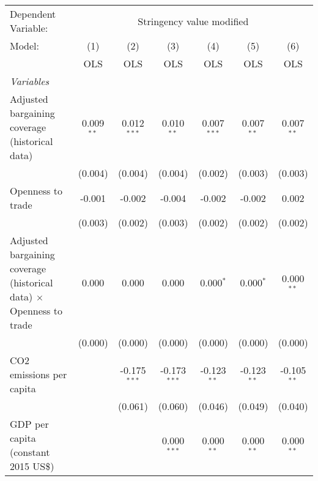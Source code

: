 
\begingroup
\centering
\begin{tabular}{lcccccc}
   \toprule
   Dependent Variable: & \multicolumn{6}{c}{Stringency value modified}\\
   Model:                                                                     & (1)          & (2)            & (3)            & (4)           & (5)           & (6)\\  
                                                                              &  OLS         & OLS            & OLS            & OLS           & OLS           & OLS\\  
   \midrule
   \emph{Variables}\\
   Adjusted bargaining coverage (historical data)                             & 0.009$^{**}$ & 0.012$^{***}$  & 0.010$^{**}$   & 0.007$^{***}$ & 0.007$^{**}$  & 0.007$^{**}$\\   
                                                                              & (0.004)      & (0.004)        & (0.004)        & (0.002)       & (0.003)       & (0.003)\\   
   Openness to trade                                                          & -0.001       & -0.002         & -0.004         & -0.002        & -0.002        & 0.002\\   
                                                                              & (0.003)      & (0.002)        & (0.003)        & (0.002)       & (0.002)       & (0.002)\\   
   Adjusted bargaining coverage (historical data) $\times$ Openness to trade  & 0.000        & 0.000          & 0.000          & 0.000$^{*}$   & 0.000$^{*}$   & 0.000$^{**}$\\   
                                                                              & (0.000)      & (0.000)        & (0.000)        & (0.000)       & (0.000)       & (0.000)\\   
   CO2 emissions per capita                                                   &              & -0.175$^{***}$ & -0.173$^{***}$ & -0.123$^{**}$ & -0.123$^{**}$ & -0.105$^{**}$\\   
                                                                              &              & (0.061)        & (0.060)        & (0.046)       & (0.049)       & (0.040)\\   
   GDP per capita (constant 2015 US\$)                                        &              &                & 0.000$^{***}$  & 0.000$^{**}$  & 0.000$^{**}$  & 0.000$^{**}$\\   

\end{tabular}
